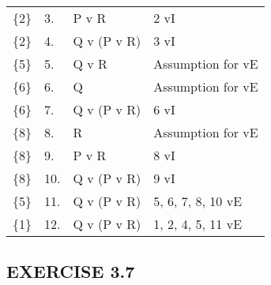 \documentclass[a4paper,12pt]{article}
\begin{document}
\begin{enumerate}[label=\arabic*,leftmargin=*]
\begin{enumerate}[label=\arabic*.]
\begin{minipage}{\textwidth}
\begin{tabular}{l l l l}
                        \{2\} & 3. & P v R & 2 vI\\
                        \{2\} & 4. & Q v (P v R) & 3 vI\\
                        \{5\} & 5. & Q v R & Assumption for vE\\
                        \{6\} & 6. & Q & Assumption for vE\\
                        \{6\} & 7. & Q v (P v R) & 6 vI\\
                        \{8\} & 8. & R & Assumption for vE\\
                        \{8\} & 9. & P v R & 8 vI\\
                        \{8\} & 10. & Q v (P v R) & 9 vI\\
                        \{5\} & 11. & Q v (P v R) & 5, 6, 7, 8, 10 vE\\
                        \{1\} & 12. & Q v (P v R) & 1, 2, 4, 5, 11 vE\\
                    \end{tabular}
                \end{minipage}

        \end{enumerate}
    \end{enumerate}

    \subsection*{EXERCISE 3.7}
\end{document}
